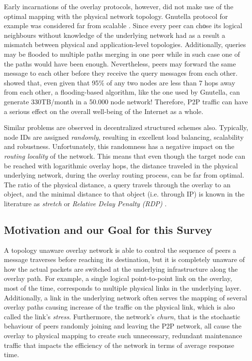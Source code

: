 Early incarnations of the overlay protocols, however, did not make use of the
optimal mapping with the physical network topology. Gnutella protocol for
example was considered far from scalable \cite{ritter_gnucantscale_2001}. Since
every peer can chοse its logical neighbours without knowledge of the underlying
network had as a result a mismatch between physical and application-level
topologies. Additionally, queries may be flooded to multiple paths merging in
one peer while in such case one of the paths would have been enough.
Nevertheless, peers may forward the same message to each other before they
receive the query messages from each other. \cite{matei_mapgnutella_2002} showed
that, even given that 95\% of any two nodes are less than 7 hops away from each
other, a flooding-based algorithm, like the one used by Gnutella, can generate
330TB/month in a 50.000 node network! Therefore, P2P traffic can have a serious
effect on the overall well-being of the Internet as a whole.

Similar problems are observed in decentralized structured schemes also.
Typically, node IDs are assigned \emph{randomly}, resulting in excellent load
balancing, scalability and robustness. Unfortunately, this randomness has a
negative impact on the \emph{routing locality} of the network. This means that
even though the target node can be reached with logarithmic overlay hops, the
distance traveled in the physical underlying network, during the overlay routing
process, can be far from optimal.  The ratio of the physical distance, a query
travels through the overlay to an object, and the minimal distance to that
object (i.e. through IP) is known in the literature as \emph{stretch} or
\emph{Relative Delay Penalty (RDP)} \cite{chu_esm_2000}.

\subsection{Motivation and our Goal for this Survey}
A topology unaware overlay network is able to control the sequence of peers a
message traverses before reaching its destination, but it is completely unaware
of how the actual packets are switched at the underlying infrastructure along
the overlay path. For example, a single logical point-to-point link on the
overlay, most of the time, corresponds to multiple physical links in the
underlying layer. Additionally, a link in the underlying network often serves
the mapping of several overlay paths causing increase of the traffic on the
physical link, which is also called the link's \emph{stress}\cite{chu_esm_2002}.
Furthermore, the network's \emph{churn}, that is the stochastic behaviour of
peers randomly joining and leaving the P2P network, all cause the overlay to
physical mapping to create such unnecessary, redundant maintenance traffic that
impacts the efficiency of the network in terms of average response time.

